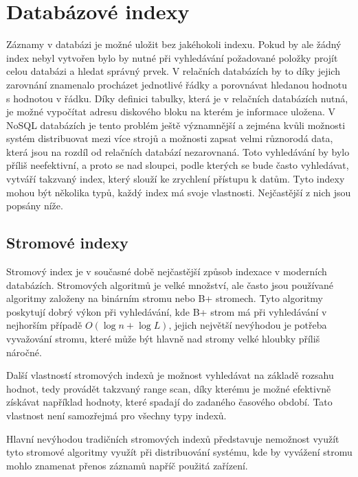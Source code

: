 \section{Databázové indexy}
Záznamy v databázi je možné uložit bez jakéhokoli indexu. Pokud by ale žádný index nebyl vytvořen bylo by nutné při vyhledávání požadované položky projít celou databázi a hledat správný prvek. V relačních databázích by to díky jejich zarovnání znamenalo procházet jednotlivé řádky a porovnávat hledanou hodnotu s hodnotou v řádku. Díky definici tabulky, která je v relačních databázích nutná, je možné vypočítat adresu diskového bloku na kterém je informace uložena. V NoSQL databázích je tento problém ještě významnější a zejména kvůli možnosti systém distribuovat mezi více strojů a možnosti zapsat velmi různorodá data, která jsou na rozdíl od relačních databází nezarovnaná. Toto vyhledávání by bylo příliš neefektivní, a proto se nad sloupci, podle kterých se bude často vyhledávat, vytváří takzvaný index, který slouží ke zrychlení přístupu k datům. Tyto indexy mohou být několika typů, každý index má svoje vlastnosti. Nejčastější z nich jsou popsány níže.
\subsection{Stromové indexy}
Stromový index je v současné době nejčastější \cite{jaluta2003recoverable} způsob indexace v moderních databázích. Stromových algoritmů je velké množství, ale často jsou používané algoritmy založeny na binárním stromu nebo B+ stromech. Tyto algoritmy poskytují dobrý výkon při vyhledávání, kde B+ strom má při vyhledávání v nejhorším případě $O(\log n + \log L)$, jejich největší nevýhodou je potřeba vyvažování stromu, které může být hlavně nad stromy velké hloubky příliš náročné.

Další vlastností stromových indexů je možnost vyhledávat na základě rozsahu hodnot, tedy provádět takzvaný range scan, díky kterému je možné efektivně získávat například hodnoty, které spadají do zadaného časového období. Tato vlastnost není samozřejmá pro všechny typy indexů.

Hlavní nevýhodou tradičních stromových indexů představuje nemožnost využít tyto stromové algoritmy využít při distribuování systému, kde by vyvážení stromu mohlo znamenat přenos záznamů napříč použitá zařízení.

